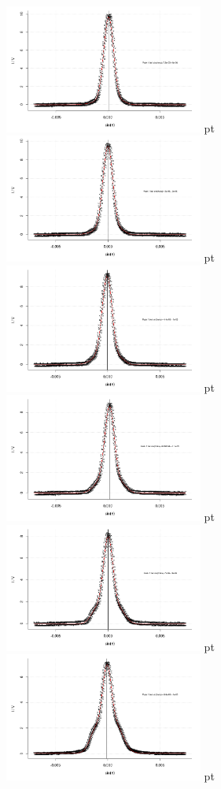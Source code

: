 \documentclass[12pt]{article}
\begin{document}
\begin{minipage}[h!]{\textwidth}
	\centering
	\includegraphics[width=0.49\textwidth]{figures/ultraschall1.png} pt
	\includegraphics[width=0.49\textwidth]{figures/ultraschall2.png} pt
	\includegraphics[width=0.49\textwidth]{figures/ultraschall3.png} pt
	\includegraphics[width=0.49\textwidth]{figures/ultraschall4.png} pt
	\includegraphics[width=0.49\textwidth]{figures/ultraschall5.png} pt
	\includegraphics[width=0.49\textwidth]{figures/ultraschall6.png} pt
\end{minipage}\newpage
\end{document}
